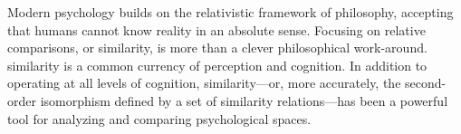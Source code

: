 \documentclass[
  authoryear]{elsarticle}
\begin{document}
Modern psychology builds on the relativistic framework of philosophy,
accepting that humans cannot know reality in an absolute sense. Focusing
on relative comparisons, or similarity, is more than a clever
philosophical work-around. similarity is a common currency of perception
and cognition. In addition to operating at all levels of cognition,
similarity---or, more accurately, the second-order isomorphism defined
by a set of similarity relations---has been a powerful tool for
analyzing and comparing psychological spaces.


  
\end{document}
